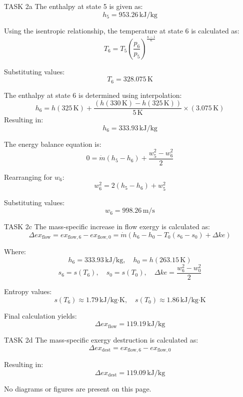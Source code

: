 TASK 2a  
The enthalpy at state 5 is given as:  
\[
h_5 = 953.26 \, \text{kJ/kg}
\]  

Using the isentropic relationship, the temperature at state 6 is calculated as:  
\[
T_6 = T_5 \left( \frac{p_6}{p_5} \right)^{\frac{\kappa - 1}{\kappa}}
\]  

Substituting values:  
\[
T_6 = 328.075 \, \text{K}
\]  

The enthalpy at state 6 is determined using interpolation:  
\[
h_6 = h(325 \, \text{K}) + \frac{(h(330 \, \text{K}) - h(325 \, \text{K}))}{5 \, \text{K}} \times (3.075 \, \text{K})
\]  
Resulting in:  
\[
h_6 = 333.93 \, \text{kJ/kg}
\]  

The energy balance equation is:  
\[
0 = \dot{m} \left( h_5 - h_6 \right) + \frac{w_5^2 - w_6^2}{2}
\]  

Rearranging for \( w_6 \):  
\[
w_6^2 = 2 \left( h_5 - h_6 \right) + w_5^2
\]  

Substituting values:  
\[
w_6 = 998.26 \, \text{m/s}
\]  

TASK 2c  
The mass-specific increase in flow exergy is calculated as:  
\[
\Delta ex_{\text{flow}} = ex_{\text{flow},6} - ex_{\text{flow},0} = \dot{m} \left( h_6 - h_0 - T_0 (s_6 - s_0) + \Delta ke \right)
\]  

Where:  
\[
h_6 = 333.93 \, \text{kJ/kg}, \quad h_0 = h(263.15 \, \text{K})
\]  
\[
s_6 = s(T_6), \quad s_0 = s(T_0), \quad \Delta ke = \frac{w_6^2 - w_0^2}{2}
\]  

Entropy values:  
\[
s(T_6) \approx 1.79 \, \text{kJ/kg·K}, \quad s(T_0) \approx 1.86 \, \text{kJ/kg·K}
\]  

Final calculation yields:  
\[
\Delta ex_{\text{flow}} = 119.19 \, \text{kJ/kg}
\]  

TASK 2d  
The mass-specific exergy destruction is calculated as:  
\[
\Delta ex_{\text{dest}} = ex_{\text{flow},6} - ex_{\text{flow},0}
\]  

Resulting in:  
\[
\Delta ex_{\text{dest}} = 119.09 \, \text{kJ/kg}
\]  

No diagrams or figures are present on this page.
